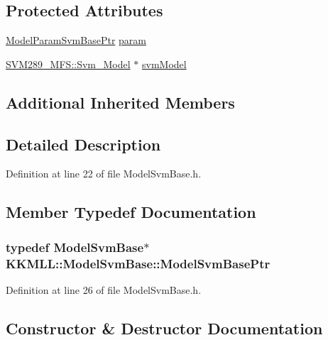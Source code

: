 \subsection*{Protected Attributes}
\begin{DoxyCompactItemize}
\item 
\hyperlink{namespace_k_k_m_l_l_a33c6027f2904ad96488db149ac30500c}{Model\+Param\+Svm\+Base\+Ptr} \hyperlink{class_k_k_m_l_l_1_1_model_svm_base_ab51783a9e9c03832590cb43294b3899f}{param}
\item 
\hyperlink{struct_s_v_m289___m_f_s_1_1_svm___model}{S\+V\+M289\+\_\+\+M\+F\+S\+::\+Svm\+\_\+\+Model} $\ast$ \hyperlink{class_k_k_m_l_l_1_1_model_svm_base_a8f6ed793dfaa080ddea8e1776d2ee755}{svm\+Model}
\end{DoxyCompactItemize}
\subsection*{Additional Inherited Members}


\subsection{Detailed Description}


Definition at line 22 of file Model\+Svm\+Base.\+h.



\subsection{Member Typedef Documentation}
\subsubsection[{\texorpdfstring{Model\+Svm\+Base\+Ptr}{ModelSvmBasePtr}}]{\setlength{\rightskip}{0pt plus 5cm}typedef {\bf Model\+Svm\+Base}$\ast$ {\bf K\+K\+M\+L\+L\+::\+Model\+Svm\+Base\+::\+Model\+Svm\+Base\+Ptr}}\hypertarget{class_k_k_m_l_l_1_1_model_svm_base_aa84f0e9baebb7df8a61acf1cf41a4461}{}\label{class_k_k_m_l_l_1_1_model_svm_base_aa84f0e9baebb7df8a61acf1cf41a4461}


Definition at line 26 of file Model\+Svm\+Base.\+h.



\subsection{Constructor \& Destructor Documentation}
